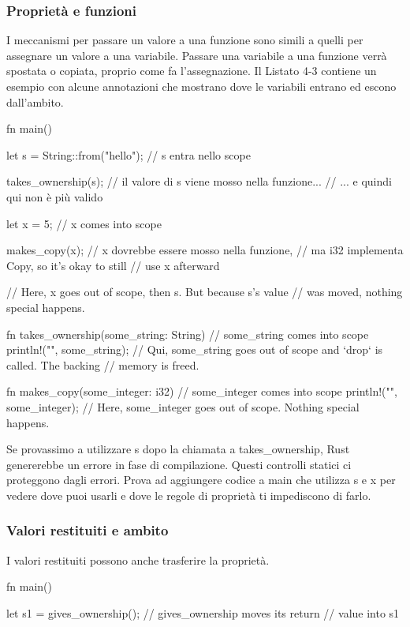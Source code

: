 \documentclass[11pt,a4paper]{article}
\begin{document}
{\subsubsection{Proprietà e funzioni}
I meccanismi per passare un valore a una funzione sono simili a quelli per assegnare un valore a una variabile. Passare una variabile a una funzione verrà spostata o copiata, proprio come fa l'assegnazione. Il Listato 4-3 contiene un esempio con alcune annotazioni che mostrano dove le variabili entrano ed escono dall'ambito.

\begin{rust}
fn main() {
    let s = String::from("hello");  // s entra nello scope

    takes_ownership(s);  // il valore di s viene mosso nella funzione...
                         // ... e quindi qui non è più valido

    let x = 5;           // x comes into scope

    makes_copy(x);       // x dovrebbe essere mosso nella funzione,
                         // ma i32 implementa Copy, so it's okay to still
                         // use x afterward

} // Here, x goes out of scope, then s. But because s's value 
  // was moved, nothing special happens.

fn takes_ownership(some_string: String) { // some_string comes into scope
    println!("{}", some_string);
} // Qui, some_string goes out of scope and `drop` is called. The backing
  // memory is freed.

fn makes_copy(some_integer: i32) { // some_integer comes into scope
    println!("{}", some_integer);
} // Here, some_integer goes out of scope. Nothing special happens.
\end{rust}

Se provassimo a utilizzare s dopo la chiamata a takes\_ownership, Rust genererebbe un errore in fase di compilazione. Questi controlli statici ci proteggono dagli errori. Prova ad aggiungere codice a main che utilizza s e x per vedere dove puoi usarli e dove le regole di proprietà ti impediscono di farlo.

\subsubsection{Valori restituiti e ambito}

I valori restituiti possono anche trasferire la proprietà.
\begin{rust}
fn main() {
    let s1 = gives_ownership();    // gives_ownership moves its return
                                   // value into s1

}
\end{rust}}
\end{document}
